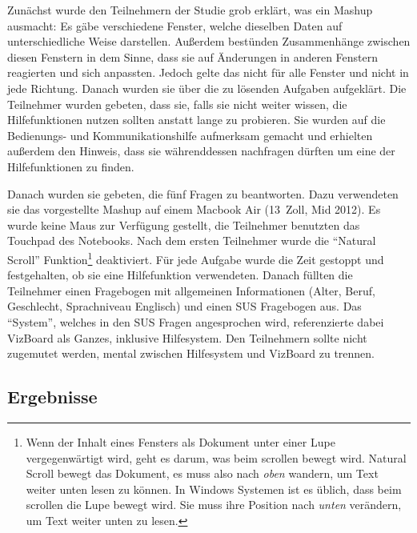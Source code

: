 \documentclass[
	headsepline,
	footsepline,
	fontsize=12pt,
	bibliography=totoc
]{scrbook}
\begin{document}
Zunächst wurde den Teilnehmern der Studie grob erklärt, was ein Mashup ausmacht: Es gäbe verschiedene Fenster, welche dieselben Daten auf unterschiedliche Weise darstellen. Außerdem bestünden Zusammenhänge zwischen diesen Fenstern in dem Sinne, dass sie auf Änderungen in anderen Fenstern reagierten und sich anpassten. Jedoch gelte das nicht für alle Fenster und nicht in jede Richtung. Danach wurden sie über die zu lösenden Aufgaben aufgeklärt. Die Teilnehmer wurden gebeten, dass sie, falls sie nicht weiter wissen, die Hilfefunktionen nutzen sollten anstatt lange zu probieren. Sie wurden auf die Bedienungs- und Kommunikationshilfe aufmerksam gemacht und erhielten außerdem den Hinweis, dass sie währenddessen nachfragen dürften um eine der Hilfefunktionen zu finden.

Danach wurden sie gebeten, die fünf Fragen zu beantworten. Dazu verwendeten sie das vorgestellte Mashup auf einem Macbook Air (13~Zoll, Mid 2012). Es wurde keine Maus zur Verfügung gestellt, die Teilnehmer benutzten das Touchpad des Notebooks. Nach dem ersten Teilnehmer wurde die \enquote{Natural Scroll} Funktion\footnote{Wenn der Inhalt eines Fensters als Dokument unter einer Lupe vergegenwärtigt wird, geht es darum, was beim scrollen bewegt wird. Natural Scroll bewegt das Dokument, es muss also nach \emph{oben} wandern, um Text weiter unten lesen zu können. In Windows Systemen ist es üblich, dass beim scrollen die Lupe bewegt wird. Sie muss ihre Position nach \emph{unten} verändern, um Text weiter unten zu lesen.} deaktiviert. Für jede Aufgabe wurde die Zeit gestoppt und festgehalten, ob sie eine Hilfefunktion verwendeten. Danach füllten die Teilnehmer einen Fragebogen mit allgemeinen Informationen (Alter, Beruf, Geschlecht, Sprachniveau Englisch) und einen SUS Fragebogen \cite{Brooke1996} aus. Das \enquote{System}, welches in den SUS Fragen angesprochen wird, referenzierte dabei VizBoard als Ganzes, inklusive Hilfesystem. Den Teilnehmern sollte nicht zugemutet werden, mental zwischen Hilfesystem und VizBoard zu trennen.

\subsection{Ergebnisse}

\end{document}
